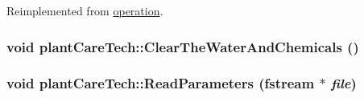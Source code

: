 Reimplemented from \hyperlink{classoperation_a51c5612f29519bc82050ffccf089bc07}{operation}.\hypertarget{classplant_care_tech_ab4b61e63f30a98eb3d877e928966272f}{
\subsubsection[{ClearTheWaterAndChemicals}]{\setlength{\rightskip}{0pt plus 5cm}void plantCareTech::ClearTheWaterAndChemicals ()}}
\label{classplant_care_tech_ab4b61e63f30a98eb3d877e928966272f}
\hypertarget{classplant_care_tech_ac699023786b1759775d57e80b5817096}{
\subsubsection[{ReadParameters}]{\setlength{\rightskip}{0pt plus 5cm}void plantCareTech::ReadParameters (fstream $\ast$ {\em file})}}
\label{classplant_care_tech_ac699023786b1759775d57e80b5817096}


